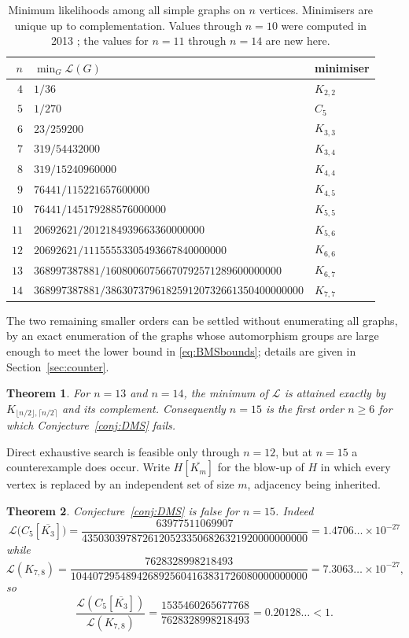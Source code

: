\documentclass[11pt]{article}
\newtheorem{theorem}{Theorem}
\theoremstyle{definition}
\newcommand{\Lk}{\mathcal{L}}
\newcommand{\Kbal}{K_{\lfloor n/2\rfloor,\lceil n/2\rceil}}
\begin{document}
\begin{table}[htbp]
\centering
\begin{tabular}{@{}rll@{}}
\toprule
$n$ & $\min_G\Lk(G)$ & minimiser\\
\midrule
$4$ & $1/36$ & $K_{2,2}$\\
$5$ & $1/270$ & $C_5$\\
$6$ & $23/259200$ & $K_{3,3}$\\
$7$ & $319/54432000$ & $K_{3,4}$\\
$8$ & $319/15240960000$ & $K_{4,4}$\\
$9$ & $76441/115221657600000$ & $K_{4,5}$\\
$10$ & $76441/145179288576000000$ & $K_{5,5}$\\
$11$ & $20692621/2012184939663360000000$ & $K_{5,6}$\\
$12$ & $20692621/11155553305493667840000000$ & $K_{6,6}$\\
$13$ & $368997387881/16080060756670792571289600000000$ & $K_{6,7}$\\
$14$ & $368997387881/386307379618259120732661350400000000$ & $K_{7,7}$\\
\bottomrule
\end{tabular}
\caption{Minimum likelihoods among all simple graphs on $n$ vertices. Minimisers are unique up to complementation. Values through $n=10$ were computed in 2013 \cite{MW,OEIS}; the values for $n=11$ through $n=14$ are new here.}
\label{tab:min}
\end{table}

The two remaining smaller orders can be settled without enumerating all graphs,
by an exact enumeration of the graphs whose automorphism groups are large enough
to meet the lower bound in \eqref{eq:BMSbounds}; details are given in
Section~\ref{sec:counter}.

\begin{theorem}\label{thm:firstfailure}
For $n=13$ and $n=14$, the minimum of $\Lk$ is attained exactly by $\Kbal$
and its complement. Consequently $n=15$ is the first order $n\ge6$ for which
Conjecture~\ref{conj:DMS} fails.
\end{theorem}

Direct exhaustive search is feasible only through $n=12$, but at $n=15$ a
counterexample does occur. Write $H[\overline{K_m}]$ for the blow-up of $H$ in which every
vertex is replaced by an independent set of size $m$, adjacency being inherited.

\begin{theorem}\label{thm:counter}
Conjecture~\ref{conj:DMS} is false for $n=15$. Indeed
\[
\Lk\big(C_5[\overline{K_3}]\big)=\frac{63977511069907}{43503039787261205233506826321920000000000}
=1.4706\ldots\times 10^{-27}
\]
while
\[
\Lk(K_{7,8})=\frac{7628328998218493}{1044072954894268925604163831726080000000000}=7.3063\ldots\times 10^{-27},
\]
so
\[
\frac{\Lk(C_5[\overline{K_3}])}{\Lk(K_{7,8})}
=\frac{1535460265677768}{7628328998218493}=0.20128\ldots<1.
\]
\end{theorem}
\end{document}
